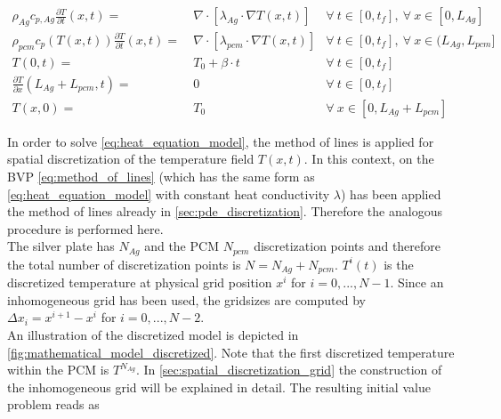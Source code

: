 \documentclass{scrartcl}[12pt, halfparskip]
\numberwithin{equation}{section}
\numberwithin{figure}{section}
\numberwithin{table}{section}
\begin{document}
\begin{subequations}
	\begin{align}
	\rho_{Ag} c_{p,Ag} \frac{\partial T}{\partial t}(x,t) = \ & \nabla \cdot \left[\lambda_{Ag} \cdot \nabla T(x,t)  \right] & \forall \ t \in [0,t_f], \ \forall \ x \in [0,L_{Ag}] \label{eq:heat_equation_Ag} \\
	\rho_{pcm} c_p(T(x,t)) \frac{\partial T}{\partial t}(x,t) = \ & \nabla \cdot \left[\lambda_{pcm} \cdot \nabla T(x,t)  \right]  & \forall \ t \in [0,t_f], \ \forall \ x \in (L_{Ag},L_{pcm}] \label{eq:heat_equation_PCM}  \\
	T(0,t) = \ & T_0 + \beta \cdot t & \forall \ t \in [0,t_f] \label{eq:heat_equation_BC_dirichlet} \\
	\frac{\partial T}{\partial x} (L_{Ag} + L_{pcm},t) = \ & 0 & \forall \ t \in [0,t_f] \label{eq:heat_equation_BC_Neumann}  \\
	T(x,0) = \ & T_0 & \forall \ x \in [0,L_{Ag} + L_{pcm}] \label{eq:heat_equation_start_values} 
	\end{align}
	\label{eq:heat_equation_model}
\end{subequations}


In order to solve \cref{eq:heat_equation_model}, the method of lines is applied for spatial discretization of the temperature field $T(x,t)$. In this context, on the BVP \cref{eq:method_of_lines} (which has the same form as \cref{eq:heat_equation_model} with constant heat conductivity $\lambda$) has been applied the method of lines already in \cref{sec:pde_discretization}. Therefore the analogous procedure is performed here. \\
The silver plate has $N_{Ag}$ and the PCM $N_{pcm}$ discretization points and therefore the total number of discretization points is $N = N_{Ag} + N_{pcm}$. $T^i(t)$ is the discretized temperature at physical grid position $x^i$ for $i=0,...,N-1$. Since an inhomogeneous grid has been used, the gridsizes are computed by $\Delta x_i = {x^{i+1} - x^i}$ for $i=0,...,N-2$. \\
An illustration of the discretized model is depicted in \cref{fig:mathematical_model_discretized}. Note that the first discretized temperature within the PCM is $T^{N_{Ag}}$.
In \cref{sec:spatial_discretization_grid} the construction of the inhomogeneous grid will be explained in detail. The resulting initial value problem reads as
\end{document}
